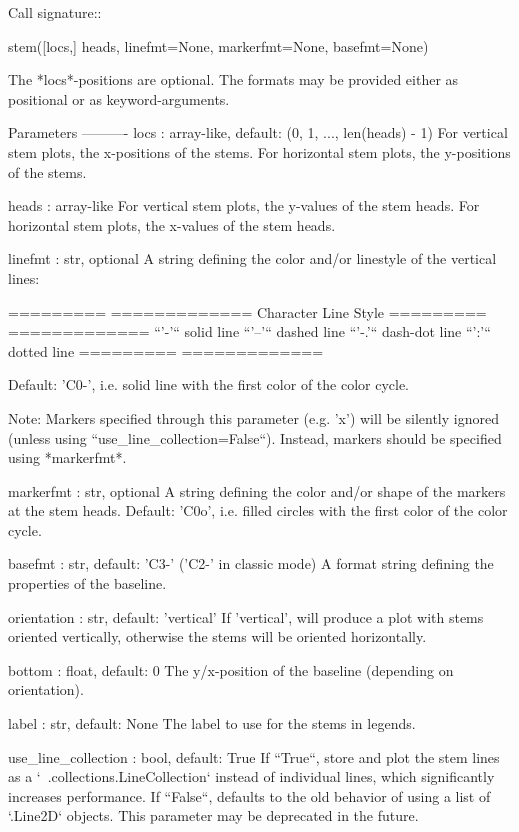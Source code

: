 \begin{DoxyVerb}
\begin{DoxyVerb}
Call signature::

  stem([locs,] heads, linefmt=None, markerfmt=None, basefmt=None)

The *locs*-positions are optional. The formats may be provided either
as positional or as keyword-arguments.

Parameters
----------
locs : array-like, default: (0, 1, ..., len(heads) - 1)
    For vertical stem plots, the x-positions of the stems.
    For horizontal stem plots, the y-positions of the stems.

heads : array-like
    For vertical stem plots, the y-values of the stem heads.
    For horizontal stem plots, the x-values of the stem heads.

linefmt : str, optional
    A string defining the color and/or linestyle of the vertical lines:

    =========  =============
    Character  Line Style
    =========  =============
    ``'-'``    solid line
    ``'--'``   dashed line
    ``'-.'``   dash-dot line
    ``':'``    dotted line
    =========  =============

    Default: 'C0-', i.e. solid line with the first color of the color
    cycle.

    Note: Markers specified through this parameter (e.g. 'x') will be
    silently ignored (unless using ``use_line_collection=False``).
    Instead, markers should be specified using *markerfmt*.

markerfmt : str, optional
    A string defining the color and/or shape of the markers at the stem
    heads.  Default: 'C0o', i.e. filled circles with the first color of
    the color cycle.

basefmt : str, default: 'C3-' ('C2-' in classic mode)
    A format string defining the properties of the baseline.

orientation : str, default: 'vertical'
    If 'vertical', will produce a plot with stems oriented vertically,
    otherwise the stems will be oriented horizontally.

bottom : float, default: 0
    The y/x-position of the baseline (depending on orientation).

label : str, default: None
    The label to use for the stems in legends.

use_line_collection : bool, default: True
    If ``True``, store and plot the stem lines as a
    `~.collections.LineCollection` instead of individual lines, which
    significantly increases performance.  If ``False``, defaults to the
    old behavior of using a list of `.Line2D` objects.  This parameter
    may be deprecated in the future.


\end{DoxyVerb}
\end{DoxyVerb}
